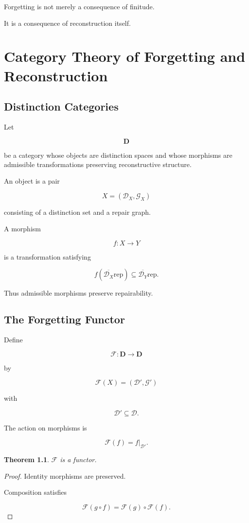 \documentclass[12pt,oneside]{book}
\theoremstyle{plain} \newtheorem{theorem}{Theorem}[chapter] \newtheorem{lemma}[theorem]{Lemma} \newtheorem{proposition}[theorem]{Proposition} \newtheorem{corollary}[theorem]{Corollary}
\theoremstyle{definition} \newtheorem{definition}[theorem]{Definition} \newtheorem{axiom}[theorem]{Axiom} \newtheorem{construction}[theorem]{Construction}
\theoremstyle{remark} \newtheorem{remark}[theorem]{Remark} \newtheorem{example}[theorem]{Example}
\newcommand{\D}{\mathcal{D}} \newcommand{\R}{\mathcal{R}} \newcommand{\F}{\mathcal{F}} \newcommand{\U}{\mathcal{U}} \newcommand{\M}{\mathcal{M}} \newcommand{\G}{\Gamma}
\begin{document}
Forgetting is not merely a consequence of finitude.

It is a consequence of reconstruction itself.

\chapter{Category Theory of Forgetting and Reconstruction}

\section{Distinction Categories}

Let

\[
\mathbf D
\]

be a category whose objects are distinction spaces and whose morphisms are admissible transformations preserving reconstructive structure.

An object is a pair

\[
X=(\D_X,\mathcal G_X)
\]

consisting of a distinction set and a repair graph.

A morphism

\[
f:X\rightarrow Y
\]

is a transformation satisfying

\[
f(\overline{\D_X}{\mathrm{rep}})
\subseteq
\overline{\D_Y}{\mathrm{rep}}.
\]

Thus admissible morphisms preserve repairability.

\section{The Forgetting Functor}

Define

\[
\mathcal F:
\mathbf D
\rightarrow
\mathbf D
\]

by

\[
\mathcal F(X)
=
(\D',\mathcal G')
\]

with

\[
\D'
\subseteq
\D.
\]

The action on morphisms is

\[
\mathcal F(f)
=
f|_{\D'}.
\]

\begin{theorem}

$\mathcal F$ is a functor.

\end{theorem}

\begin{proof}

Identity morphisms are preserved.

Composition satisfies

\[
\mathcal F(g\circ f)
=
\mathcal F(g)
\circ
\mathcal F(f).
\]

\end{proof}
\end{document}
